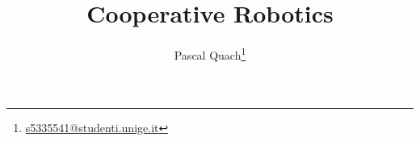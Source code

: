 \title{Cooperative Robotics}
\author[1]{Pascal Quach\thanks{\href{mailto:s5335541@studenti.unige.it}{s5335541@studenti.unige.it}}}
\maketitle
